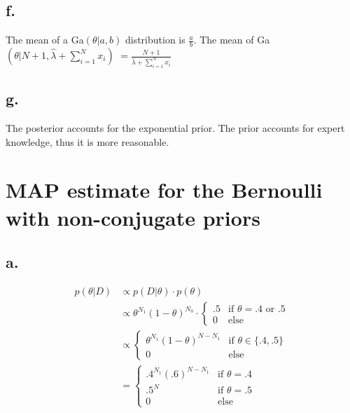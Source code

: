\documentclass{article}
\begin{document}
\subsection{f.}

The mean of a Ga$(\theta|a,b)$ distribution is $\frac{a}{b}$. The mean
of \mbox{Ga$(\theta|N+1, \hat{\lambda} + \sum_{i=1}^N x_i)$} $= \frac{N+1}{ \hat{\lambda} + \sum_{i=1}^N x_i}$

\subsection{g.}

The posterior accounts for the exponential prior. The prior accounts
for expert knowledge, thus it is more reasonable.

\section{MAP estimate for the Bernoulli with non-conjugate priors}

\subsection{a.}

\begin{align*}
  p(\theta|D) &\propto p(D|\theta) \cdot p(\theta) \\
              &\propto \theta^{N_1}(1 - \theta)^{N_0} \cdot
                \left\{ \begin{array}{ll}
                          .5 & \mbox{if $\theta = .4 \text{ or } .5$} \\
                          0 & \mbox{else} \end{array} \right. \\
              &\propto \left\{ \begin{array}{ll}
                                 \theta^{N_1}(1 - \theta)^{N - N_1} &
                                                                      \mbox{if
                                                                      $\theta
                                                                      \in
                                                                      \{.4,
                                                                      .5\}$} \\
                                 0 & \mbox{else} \end{array} \right.
  \\
              &= \left\{ \begin{array}{ll}
                           .4^{N_1}(.6)^{N - N_1} & \mbox{if $\theta = .4$} \\
                           .5^N & \mbox{if $\theta = .5$} \\
                           0 & \mbox{else} \end{array} \right.
  \\
\end{align*}
\end{document}
